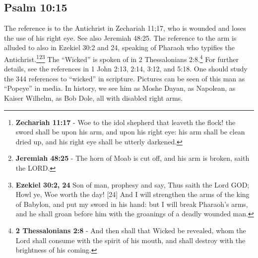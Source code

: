 \subsection{Psalm 10:15}
The reference is to the Antichrist in Zechariah 11;17, who is wounded and loses the use of his right eye. See also Jeremiah 48:25. The reference to the arm is alluded to also in Ezekiel 30:2 and 24, speaking of Pharaoh who typifies the Antichrist.\footnote{\textbf{Zechariah 11:17} -  Woe to the idol shepherd that leaveth the flock! the sword shall be upon his arm, and upon his right eye: his arm shall be clean dried up, and his right eye shall be utterly darkened.}\footnote{\textbf{Jeremiah 48:25} - The horn of Moab is cut off, and his arm is broken, saith the LORD.}\footnote{\textbf{Ezekiel 30:2, 24} Son of man, prophesy and say, Thus saith the Lord GOD; Howl ye, Woe worth the day! [24] And I will strengthen the arms of the king of Babylon, and put my sword in his hand: but I will break Pharaoh’s arms, and he shall groan before him with the groanings of a deadly wounded man.} The ``Wicked'' is spoken of in 2 Thessalonians 2:8.\footnote{\textbf{2 Thessalonians 2:8} - And then shall that Wicked be revealed, whom the Lord shall consume with the spirit of his mouth, and shall destroy with the brightness of his coming.} For further details, see the references in 1 John 2:13, 2:14, 3:12, and 5:18. One should study the 344 references to ``wicked'' in scripture. Pictures can be seen of this man as ``Popeye'' in media. In history, we see him as Moshe Dayan, as Napolean, as Kaiser Wilhelm, as Bob Dole, all with disabled right arms.\cite{Ruckman1992Psalms}



\newpage

